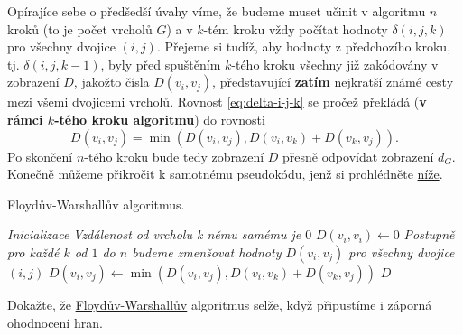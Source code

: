 Opírajíce sebe o předšedší úvahy víme, že budeme muset učinit v algoritmu $n$
kroků (to je počet vrcholů $G$) a v $k$-tém kroku vždy počítat hodnoty
$\delta(i,j,k)$ pro všechny dvojice $(i,j)$. Přejeme si tudíž, aby hodnoty z
předchozího kroku, tj. $\delta(i,j,k-1)$, byly před spuštěním $k$-tého kroku
všechny již zakódovány v zobrazení $D$, jakožto čísla $D(v_i,v_j)$,
představující \textbf{zatím} nejkratší známé cesty mezi všemi dvojicemi vrcholů.
Rovnost \eqref{eq:delta-i-j-k} se pročež překládá (\textbf{v rámci $k$-tého
kroku algoritmu}) do rovnosti
\[
 D(v_i,v_j) = \min(D(v_i,v_j), D(v_i,v_k) + D(v_k, v_j)).
\]
Po skončení $n$-tého kroku bude tedy zobrazení $D$ přesně odpovídat zobrazení
$d_G$. Konečně můžeme přikročit k samotnému pseudokódu, jenž si prohlédněte
\hyperref[alg:floyd-warshall]{níže}.

\begin{algorithm}
 \caption{Floydův-Warshallův algoritmus.}
 \label{alg:floyd-warshall}


 \BlankLine
 \emph{Inicializace}\;
  {
   {
    {
    \emph{Vzdálenost od vrcholu k němu samému je $0$}\;
    $D(v_i,v_i) \leftarrow 0$\;
   }
  }
 }
 \BlankLine
 \emph{Postupně pro každé $k$ od $1$ do $n$ budeme zmenšovat hodnoty
 $D(v_i,v_j)$ pro všechny dvojice $(i,j)$}\;
  {
   {
    {
    $D(v_i,v_j) \leftarrow \min(D(v_i,v_j), D(v_i,v_k) + D(v_k,v_j))$\;
   }
  }
 }
 \KwReturn $D$\;
\end{algorithm}

\begin{exercise}
 Dokažte, že \hyperref[alg:floyd-warshall]{Floydův-Warshallův} algoritmus selže,
 když připustíme i záporná ohodnocení hran.
\end{exercise}

